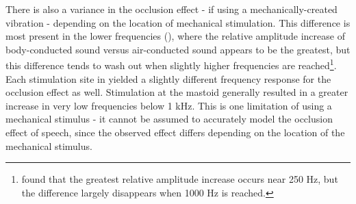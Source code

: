 There is also a variance in the occlusion effect - if using a mechanically-created vibration - depending on the location of mechanical stimulation.  This difference is most present in the lower frequencies (\cite{dean:00}), where the relative amplitude increase of body-conducted sound versus air-conducted sound appears to be the greatest, but this difference tends to wash out when slightly higher frequencies are reached\footnote{\cite{dean:00} found that the greatest relative amplitude increase occurs near 250 Hz, but the difference largely disappears when 1000 Hz is reached.}.  Each stimulation site in \cite{stenfelt:07} yielded a slightly different frequency response for the occlusion effect as well.  Stimulation at the mastoid generally resulted in a greater increase in very low frequencies below 1 kHz.  This is one limitation of using a mechanical stimulus - it cannot be assumed to accurately model the occlusion effect of speech, since the observed effect differs depending on the location of the mechanical stimulus.



